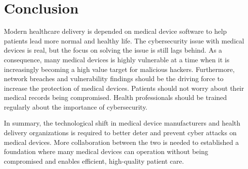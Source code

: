 \documentclass[pdf,bookmarks,colorlinks=true]{IEEEtran}
\begin{document}
\section{Conclusion}
\label{sec:Conclusion}
Modern healthcare delivery is depended on medical device software to help patients lead more normal and healthy life. The cybersecurity issue with medical devices is real, but the focus on solving the issue is still lags behind. As a consequence, many medical devices is highly vulnerable at a time when it is increasingly becoming a high value target for malicious hackers. Furthermore, network breaches and vulnerability findings should be the driving force to increase the protection of medical devices. Patients should not worry about their medical records being compromised. Health professionals should be trained regularly about the importance of cybersecurity. \par 
In summary, the technological shift in medical device manufacturers and health delivery organizations is required to better deter and prevent cyber attacks on medical devices. More collaboration between the two is needed to established a foundation where many medical devices can operation without being compromised and enables efficient, high-quality patient care.





\end{document}
